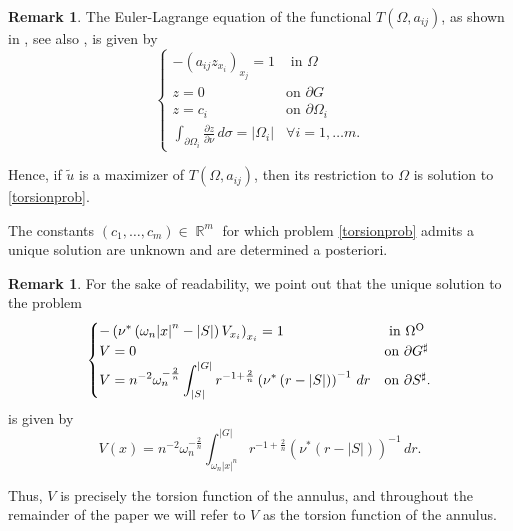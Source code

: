 \documentclass[oneside,a4paper,11pt,notitlepage]{article}
\newcommand{\abs}[1]{{\left|#1\right|}}
\theoremstyle{definition}
\theoremstyle{plain}
\theoremstyle{definition}
\newtheorem{oss}[esempio]{Remark}
\DeclareMathOperator{\R}{\mathbb{R}}
\newcommand{\OO}{\text{\normalfont  O}}
\begin{document}
\begin{oss}
The Euler-Lagrange equation of the functional $T(\Omega,a_{ij})$, as shown in \cite{B,PW}, see also \cite{BS,K}, is given by \begin{equation}\label{torsionprob}
        \begin{cases}
            -\left(a_{ij}z_{x_i}\right)_{x_j}=1 & \text{ in } \Omega \\
            z = 0 & \text{on } \partial G \\
            z=c_i & \text{on } \partial \Omega_i
        \\ \displaystyle{\int_{\partial \Omega_i} \frac{\partial z}{\partial  \nu } \, d\sigma =\abs{\Omega_i} }& \forall i=1,\dots m.\end{cases}
    \end{equation}  
    
    Hence, if $\tilde u$ is a maximizer of $T(\Omega,a_{ij})$, then its restriction to $\Omega$ is solution to \eqref{torsionprob}.
    
    The constants $(c_1,\dots,c_m)\in\R^m$ for which problem \eqref{torsionprob} admits a unique solution are unknown and are determined a posteriori.

\end{oss}

\begin{oss}
    For the sake of readability, we point out that the unique solution to the problem 
     \begin{equation}
    	\label{probsimm}
        \begin{cases}
            \displaystyle{-\left(\nu^*\left(\omega_n\abs{x}^n-\abs{S}\right)V_{x_i}\right)_{x_i}=1} & \text{ in } \Omega^\OO \\
            \displaystyle{V = 0} & \text{on } \partial G^\sharp \\
            \displaystyle{V=n^{-2}\omega_n^{-\frac{2}{n}}\int_{\abs{S}}^\abs{G}r^{-1+\frac{2}{n}}\left(\nu^*\left(r-\abs{S}\right)\right)^{-1}\,dr} & \text{on } \partial S^\sharp.
        \end{cases}
    \end{equation}
    is given by 
    \begin{equation}\label{defV}
      V(x)=n^{-2}\omega_n^{-\frac{2}{n}}\int_{\omega_n\abs{x}^n}^\abs{G}r^{-1+\frac{2}{n}}\left(\nu^*\left(r-\abs{S}\right)\right)^{-1}\,dr.
    \end{equation}

    Thus, $V$ is precisely the torsion function of the annulus, and throughout the remainder of the paper we will refer to $V$ as the torsion function of the annulus.
\end{oss}
\end{document}
